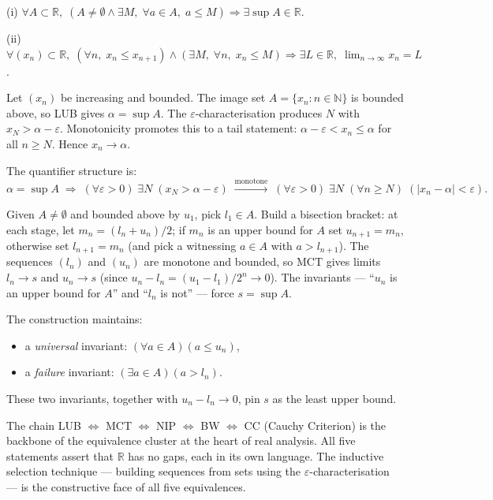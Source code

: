 \begin{remark}
(i) $\forall A\subset\mathbb{R},\;
    (A\neq\emptyset\land\exists M,\;\forall a\in A,\;a\leq M)
    \Rightarrow\exists\sup A\in\mathbb{R}$.

(ii) $\forall(x_n)\subset\mathbb{R},\;
    (\forall n,\;x_n\leq x_{n+1})\land(\exists M,\;\forall n,\;x_n\leq M)
    \Rightarrow\exists L\in\mathbb{R},\;\lim_{n\to\infty}x_n=L$.
\end{remark}

\begin{remark}
Let $(x_n)$ be increasing and bounded. The image set $A=\{x_n:n\in\mathbb{N}\}$
is bounded above, so LUB gives $\alpha=\sup A$. The
$\varepsilon$-characterisation produces $N$ with $x_N>\alpha-\varepsilon$.
Monotonicity promotes this to a tail statement: $\alpha-\varepsilon<x_n\leq\alpha$
for all $n\geq N$. Hence $x_n\to\alpha$.

The quantifier structure is:
\[
  \alpha=\sup A
  \;\Rightarrow\;
  (\forall\varepsilon>0)\;\exists N\;(x_N>\alpha-\varepsilon)
  \;\xrightarrow{\text{monotone}}\;
  (\forall\varepsilon>0)\;\exists N\;(\forall n\geq N)\;(|x_n-\alpha|<\varepsilon).
\]
\end{remark}

\begin{remark}
Given $A\neq\emptyset$ and bounded above by $u_1$, pick $l_1\in A$.
Build a bisection bracket: at each stage, let $m_n=(l_n+u_n)/2$; if $m_n$
is an upper bound for $A$ set $u_{n+1}=m_n$, otherwise set $l_{n+1}=m_n$
(and pick a witnessing $a\in A$ with $a>l_{n+1}$). The sequences $(l_n)$
and $(u_n)$ are monotone and bounded, so MCT gives limits
$l_n\to s$ and $u_n\to s$ (since $u_n-l_n=(u_1-l_1)/2^n\to 0$). The
invariants — ``$u_n$ is an upper bound for $A$'' and ``$l_n$ is not'' —
force $s=\sup A$.

\medskip
The construction maintains:
\begin{itemize}
  \item a \emph{universal} invariant: $(\forall a\in A)(a\leq u_n)$,
  \item a \emph{failure} invariant: $(\exists a\in A)(a>l_n)$.
\end{itemize}
These two invariants, together with $u_n-l_n\to 0$, pin $s$ as the least
upper bound.
\end{remark}

\begin{remark}
The chain LUB $\Leftrightarrow$ MCT $\Leftrightarrow$ NIP $\Leftrightarrow$
BW $\Leftrightarrow$ CC (Cauchy Criterion) is the backbone of the equivalence
cluster at the heart of real analysis. All five statements assert that
$\mathbb{R}$ has no gaps, each in its own language. The inductive selection
technique — building sequences from sets using the $\varepsilon$-characterisation
— is the constructive face of all five equivalences.
\end{remark}

